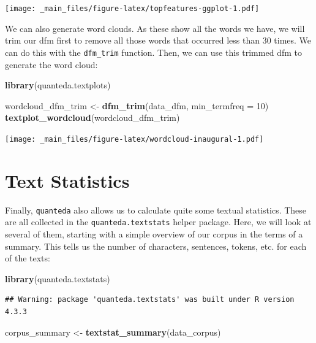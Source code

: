 \documentclass[
]{book}
\newenvironment{Shaded}{\begin{snugshade}}{\end{snugshade}}
\newcommand{\AttributeTok}[1]{\textcolor[rgb]{0.13,0.29,0.53}{#1}}
\newcommand{\DecValTok}[1]{\textcolor[rgb]{0.00,0.00,0.81}{#1}}
\newcommand{\FunctionTok}[1]{\textcolor[rgb]{0.13,0.29,0.53}{\textbf{#1}}}
\newcommand{\NormalTok}[1]{#1}
\newcommand{\OtherTok}[1]{\textcolor[rgb]{0.56,0.35,0.01}{#1}}
\begin{document}
\texttt{[image: \_main\_files/figure-latex/topfeatures-ggplot-1.pdf]}

We can also generate word clouds. As these show all the words we have, we will trim our dfm first to remove all those words that occurred less than 30 times. We can do this with the \texttt{dfm\_trim} function. Then, we can use this trimmed dfm to generate the word cloud:

\begin{Shaded}
\begin{Highlighting}[]
\FunctionTok{library}\NormalTok{(quanteda.textplots)}

\NormalTok{wordcloud\_dfm\_trim }\OtherTok{\textless{}{-}} \FunctionTok{dfm\_trim}\NormalTok{(data\_dfm, }\AttributeTok{min\_termfreq =} \DecValTok{10}\NormalTok{)}
\FunctionTok{textplot\_wordcloud}\NormalTok{(wordcloud\_dfm\_trim)}
\end{Highlighting}
\end{Shaded}

\texttt{[image: \_main\_files/figure-latex/wordcloud-inaugural-1.pdf]}

\section{Text Statistics}\label{text-statistics}

Finally, \texttt{quanteda} also allows us to calculate quite some textual statistics. These are all collected in the \texttt{quanteda.textstats} helper package. Here, we will look at several of them, starting with a simple overview of our corpus in the terms of a summary. This tells us the number of characters, sentences, tokens, etc. for each of the texts:

\begin{Shaded}
\begin{Highlighting}[]
\FunctionTok{library}\NormalTok{(quanteda.textstats)}
\end{Highlighting}
\end{Shaded}

\begin{verbatim}
## Warning: package 'quanteda.textstats' was built under R version 4.3.3
\end{verbatim}

\begin{Shaded}
\begin{Highlighting}[]
\NormalTok{corpus\_summary }\OtherTok{\textless{}{-}} \FunctionTok{textstat\_summary}\NormalTok{(data\_corpus)}
\end{Highlighting}
\end{Shaded}
\end{document}
